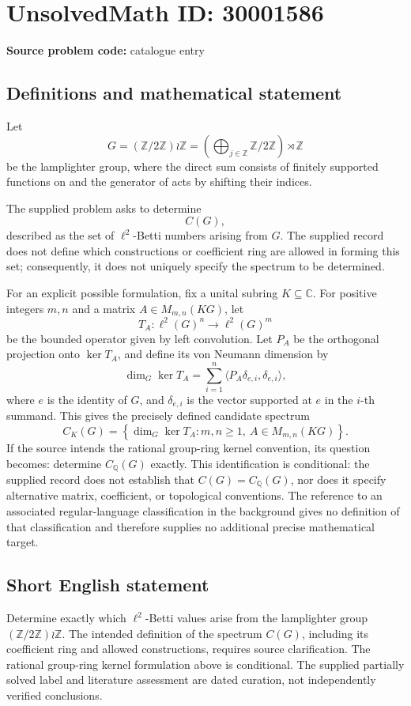 \documentclass[11pt]{article}
\newcommand{\Z}{\mathbb{Z}}
\newcommand{\Q}{\mathbb{Q}}
\newcommand{\C}{\mathbb{C}}
\begin{document}
\section*{UnsolvedMath ID: 30001586}
\textbf{Source problem code:} catalogue entry
\subsection{Definitions and mathematical statement}
Let
\[
G=(\Z/2\Z)\wr\Z
 =\left(\bigoplus_{j\in\Z}\Z/2\Z\right)\rtimes\Z
\]
be the lamplighter group, where the direct sum consists of finitely supported functions on \Z and the generator of \Z acts by shifting their indices.

The supplied problem asks to determine
\[
C(G),
\]
described as the set of \(\ell^2\)-Betti numbers arising from \(G\). The supplied record does not define which constructions or coefficient ring are allowed in forming this set; consequently, it does not uniquely specify the spectrum to be determined.

For an explicit possible formulation, fix a unital subring \(K\subseteq\C\). For positive integers \(m,n\) and a matrix \(A\in M_{m,n}(KG)\), let
\[
T_A:\ell^2(G)^n\longrightarrow\ell^2(G)^m
\]
be the bounded operator given by left convolution. Let \(P_A\) be the orthogonal projection onto \(\ker T_A\), and define its von Neumann dimension by
\[
\dim_G\ker T_A
 =\sum_{i=1}^{n}\langle P_A\delta_{e,i},\delta_{e,i}\rangle,
\]
where \(e\) is the identity of \(G\), and \(\delta_{e,i}\) is the vector supported at \(e\) in the \(i\)-th summand. This gives the precisely defined candidate spectrum
\[
C_K(G)=\left\{\dim_G\ker T_A:
 m,n\geq1,\ A\in M_{m,n}(KG)\right\}.
\]
If the source intends the rational group-ring kernel convention, its question becomes: determine \(C_{\Q}(G)\) exactly. This identification is conditional: the supplied record does not establish that \(C(G)=C_{\Q}(G)\), nor does it specify alternative matrix, coefficient, or topological conventions. The reference to an associated regular-language classification in the background gives no definition of that classification and therefore supplies no additional precise mathematical target.
\subsection{Short English statement}
Determine exactly which \(\ell^2\)-Betti values arise from the lamplighter group \((\Z/2\Z)\wr\Z\). The intended definition of the spectrum \(C(G)\), including its coefficient ring and allowed constructions, requires source clarification. The rational group-ring kernel formulation above is conditional. The supplied partially solved label and literature assessment are dated curation, not independently verified conclusions.
\end{document}
